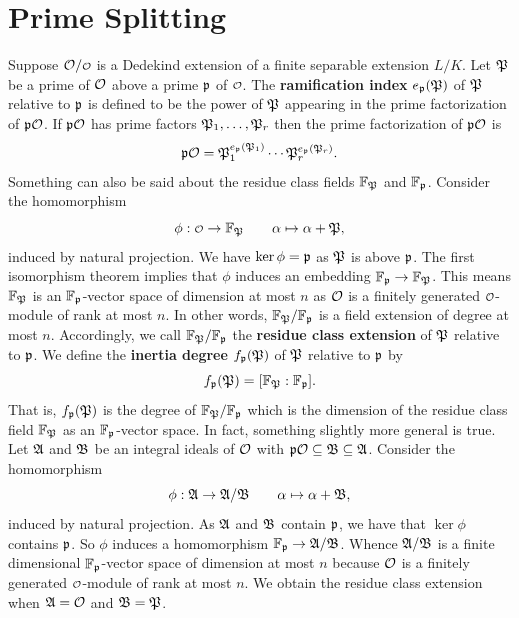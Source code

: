   \section{Prime Splitting}
    Suppose \(\mc{O}/\smc{O}\) is a Dedekind extension of a finite separable extension \(L/K\). Let \(\mathfrak{P}\) be a prime of \(\mathcal{O}\) above a prime \(\mathfrak{p}\) of \(\smc{O}\). The \textbf{ramification index} \(e_{\mathfrak{p}}(\mathfrak{P})\) of \(\mathfrak{P}\) relative to \(\mathfrak{p}\) is defined to be the power of \(\mathfrak{P}\) appearing in the prime factorization of \(\mathfrak{p}\mathcal{O}\). If \(\mathfrak{p}\mathcal{O}\) has prime factors \(\mathfrak{P}_{1},\ldots,\mathfrak{P}_{r}\) then the prime factorization of \(\mathfrak{p}\mathcal{O}\) is
    \[
      \mathfrak{p}\mathcal{O} = \mathfrak{P}_{1}^{e_{\mathfrak{p}}(\mathfrak{P}_{1})} \cdots \mathfrak{P}_{r}^{e_{\mathfrak{p}}(\mathfrak{P}_{r})}.
    \]
    Something can also be said about the residue class fields \(\mathbb{F}_{\mathfrak{P}}\) and \(\mathbb{F}_{\mathfrak{p}}\). Consider the homomorphism
    \[
      \phi:\smc{O} \to \F_{\mf{P}} \qquad \a \mapsto \a+\mf{P},
    \]
    induced by natural projection. We have \(\ker\phi = \mathfrak{p}\) as \(\mathfrak{P}\) is above \(\mathfrak{p}\). The first isomorphism theorem implies that \(\phi\) induces an embedding \(\mathbb{F}_{\mathfrak{p}} \to \mathbb{F}_{\mathfrak{P}}\). This means \(\mathbb{F}_{\mathfrak{P}}\) is an \(\mathbb{F}_{\mathfrak{p}}\)-vector space of dimension at most \(n\) as \(\mathcal{O}\) is a finitely generated \(\smc{O}\)-module of rank at most \(n\). In other words, \(\mathbb{F}_{\mathfrak{P}}/\mathbb{F}_{\mathfrak{p}}\) is a field extension of degree at most \(n\). Accordingly, we call \(\mathbb{F}_{\mathfrak{P}}/\mathbb{F}_{\mathfrak{p}}\) the \textbf{residue class extension} of \(\mathfrak{P}\) relative to \(\mathfrak{p}\). We define the \textbf{inertia degree} \(f_{\mathfrak{p}}(\mathfrak{P})\) of \(\mathfrak{P}\) relative to \(\mathfrak{p}\) by
    \[
      f_{\mathfrak{p}}(\mathfrak{P}) = [\mathbb{F}_{\mathfrak{P}}:\mathbb{F}_{\mathfrak{p}}].
    \]
    That is, \(f_{\mathfrak{p}}(\mathfrak{P})\) is the degree of \(\mathbb{F}_{\mathfrak{P}}/\mathbb{F}_{\mathfrak{p}}\) which is the dimension of the residue class field \(\mathbb{F}_{\mathfrak{P}}\) as an \(\mathbb{F}_{\mathfrak{p}}\)-vector space. In fact, something slightly more general is true. Let \(\mathfrak{A}\) and \(\mathfrak{B}\) be an integral ideals of \(\mathcal{O}\) with \(\mathfrak{p}\mathcal{O} \subseteq \mathfrak{B} \subseteq \mathfrak{A}\). Consider the homomorphism
    \[
      \phi:\mathfrak{A} \to \mathfrak{A}/\mathfrak{B} \qquad \alpha \mapsto \alpha+\mathfrak{B},
    \]
    induced by natural projection. As \(\mathfrak{A}\) and \(\mathfrak{B}\) contain \(\mathfrak{p}\), we have that \(\ker\phi\) contains \(\mathfrak{p}\). So \(\phi\) induces a homomorphism \(\mathbb{F}_{\mathfrak{p}} \to \mathfrak{A}/\mathfrak{B}\). Whence \(\mathfrak{A}/\mathfrak{B}\) is a finite dimensional \(\mathbb{F}_{\mathfrak{p}}\)-vector space of dimension at most \(n\) because \(\mathcal{O}\) is a finitely generated \(\smc{O}\)-module of rank at most \(n\). We obtain the residue class extension when \(\mathfrak{A} = \mathcal{O}\) and \(\mathfrak{B} = \mathfrak{P}\).

